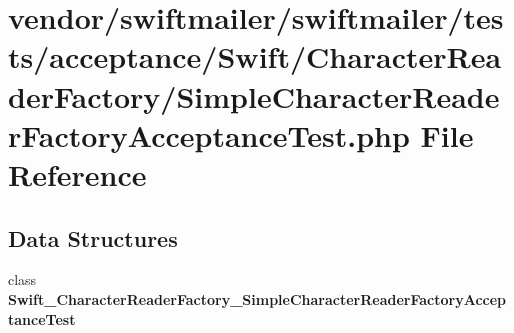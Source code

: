 \section{vendor/swiftmailer/swiftmailer/tests/acceptance/\+Swift/\+Character\+Reader\+Factory/\+Simple\+Character\+Reader\+Factory\+Acceptance\+Test.php File Reference}
\label{_simple_character_reader_factory_acceptance_test_8php}
\subsection*{Data Structures}
\begin{DoxyCompactItemize}
\item 
class {\bf Swift\+\_\+\+Character\+Reader\+Factory\+\_\+\+Simple\+Character\+Reader\+Factory\+Acceptance\+Test}
\end{DoxyCompactItemize}
